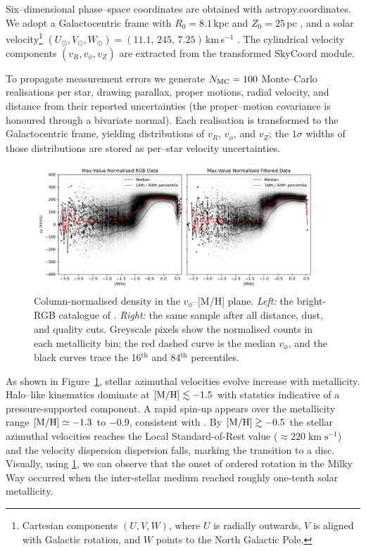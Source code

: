 \documentclass[a4paper,12pt]{article}
\begin{document}
Six–dimensional phase–space coordinates are obtained with
astropy.coordinates.  We adopt a Galactocentric frame
with $R_{0}=8.1$\,kpc and $Z_{0}=25$\,pc \citep{McMillan2016}, and a solar
velocity\footnote{Cartesian components $(U,V,W)$, where $U$ is radially
outwards, $V$ is aligned with Galactic rotation, and $W$ points to the
North Galactic Pole.}
$(U_{\odot},V_{\odot},W_{\odot})=(11.1,\,245,\,7.25)$\,km\,s$^{-1}$
\citep{Schonrich2010}.
The cylindrical velocity components
$(v_{R},v_{\phi},v_{Z})$ are extracted from the transformed
SkyCoord module.

To propagate measurement errors we generate
$N_{\rm MC}=100$ Monte–Carlo realisations per star, drawing
parallax, proper motions, radial velocity, and distance from their
reported uncertainties (the proper–motion covariance is honoured
through a bivariate normal).  Each realisation is transformed to the
Galactocentric frame, yielding distributions of
$v_{R}$, $v_{\phi}$, and $v_{Z}$; the $1\sigma$ widths of those
distributions are stored as per–star velocity uncertainties.




\begin{figure}
  \centering
  \includegraphics[width=0.94\textwidth]{../figures/vphi_histograms_with_tracks.png}
  \caption{Column-normalised density in the $v_{\phi}$–[M/H] plane.
           \textit{Left:} the bright-RGB catalogue of \citet{Andrae2023}.
           \textit{Right:} the same sample after all distance,
           dust, and quality cuts.  Greyscale pixels show the normalised
           counts in each metallicity bin; the red dashed curve is the
           median $v_{\phi}$, and the black curves trace the 16$^{\text{th}}$
           and 84$^{\text{th}}$ percentiles.}
  \label{fig:vphi_tracks}
\end{figure}



As shown in Figure~\ref{fig:vphi_tracks}, stellar azimuthal velocities
evolve increase with metallicity.  Halo–like kinematics dominate at
${\rm [M/H]}\lesssim-1.5$ with statstics
indicative of a pressure-supported component.  A rapid spin-up appears over the 
metallicity range ${\rm [M/H]} \simeq -1.3$ to $-0.9$, consistent with \citet{Belokurov2022}.
By ${\rm [M/H]}\gtrsim-0.5$ the stellar azimuthal velocities reaches the Local
Standard-of-Rest value ($\approx220\;\mathrm{km\;s^{-1}}$) and the
velocity dispersion dispersion falls, marking the
transition to a disc.  Visually, using \ref{fig:vphi_tracks}, we can observe
that the onset of ordered rotation in the Milky Way occurred when the inter-stellar medium
reached roughly one-tenth solar metallicity.
\end{document}

